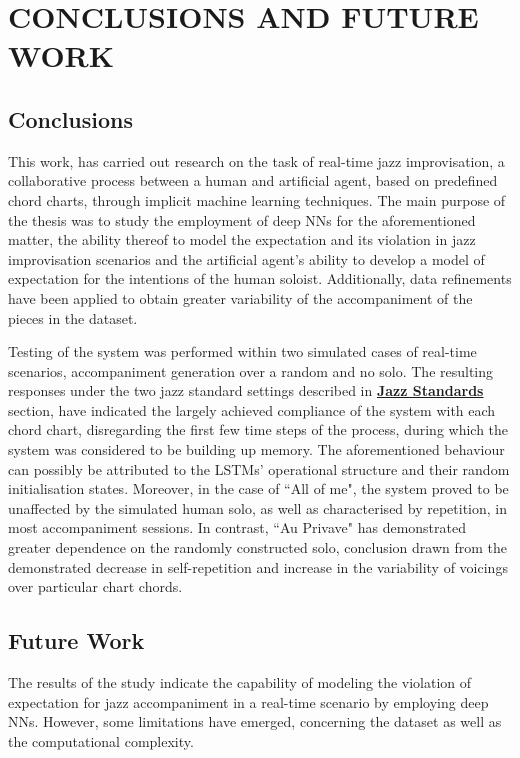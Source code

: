 \chapter{CONCLUSIONS AND FUTURE WORK} \label{chapter:conclusions_futurework}
    \section{Conclusions}
    This work, has carried out research on the task of real-time jazz improvisation, a collaborative process between a human and artificial agent, based on predefined chord charts, through implicit machine learning techniques. The main purpose of the thesis was to study the employment of deep NNs for the aforementioned matter, the ability thereof to model the expectation and its violation in jazz improvisation scenarios and the artificial agent's ability to develop a model of expectation for the intentions of the human soloist. Additionally, data refinements have been applied to obtain greater variability of the accompaniment of the pieces in the dataset. 

    Testing of the system was performed within two simulated cases of real-time scenarios, accompaniment generation over a random and no solo. The resulting responses under the two jazz standard settings described in \hyperref[sec:jazzStandards]{\textbf{Jazz Standards}} section, have indicated the largely achieved compliance of the system with each chord chart, disregarding the first few time steps of the process, during which the system was considered to be building up memory. The aforementioned behaviour can possibly be attributed to the LSTMs' operational structure and their random initialisation states. Moreover, in the case of ``All of me", the system proved to be unaffected by the simulated human solo, as well as characterised by repetition, in most accompaniment sessions. In contrast, ``Au Privave" has demonstrated greater dependence on the randomly constructed solo, conclusion drawn from the demonstrated decrease in self-repetition and increase in the variability of voicings over particular chart chords.  

    \section{Future Work}
    The results of the study indicate the capability of modeling the violation of expectation for jazz accompaniment in a real-time scenario by employing deep NNs. However, some limitations have emerged, concerning the dataset as well as the computational complexity. 

